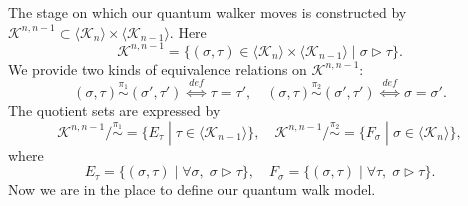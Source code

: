 \documentclass[a4paper,12pt]{article}
\newcommand{\bra}{\langle}
\newcommand{\ket}{\rangle}
\numberwithin{equation}{section}
\begin{document}
The stage on which our quantum walker moves is constructed by $\mathcal{K}^{n,n-1}\subset \bra \mathcal{K}_n \ket\times \bra \mathcal{K}_{n-1} \ket$. 
Here
\begin{equation*}
\mathcal{K}^{n,n-1}=\{ (\sigma,\tau)\in \bra \mathcal{K}_n \ket\times \bra \mathcal{K}_{n-1} \ket \;|\; \sigma\triangleright \tau\}.
\end{equation*}
We provide two kinds of equivalence relations on $\mathcal{K}^{n,n-1}$: 
\begin{equation*}
(\sigma,\tau) \stackrel{\pi_1}{\sim} (\sigma',\tau') \ \stackrel{def}{\Leftrightarrow} \  \tau=\tau',\quad 
(\sigma,\tau) \stackrel{\pi_2}{\sim} (\sigma',\tau') \ \stackrel{def}{\Leftrightarrow} \  \sigma=\sigma'. 
\end{equation*}
The quotient sets are expressed by
\begin{equation*}
        \mathcal{K}^{n,n-1}/\stackrel{\pi_1}{\sim} = \{ E_\tau \;|\; \tau\in \bra \mathcal{K}_{n-1} \ket \}, \quad 
        \mathcal{K}^{n,n-1}/\stackrel{\pi_2}{\sim} = \{ F_\sigma \;|\; \sigma\in \bra \mathcal{K}_{n} \ket \},
\end{equation*}	
where 
\begin{equation}
\label{set-E-F}
E_\tau = \{ (\sigma,\tau) \;|\; \forall \sigma,\;\sigma\triangleright \tau \}, \quad
F_\sigma = \{ (\sigma,\tau) \;|\; \forall \tau,\;\sigma\triangleright \tau \}.
\end{equation}
Now we are in the place to define our quantum walk model. 
\end{document}
